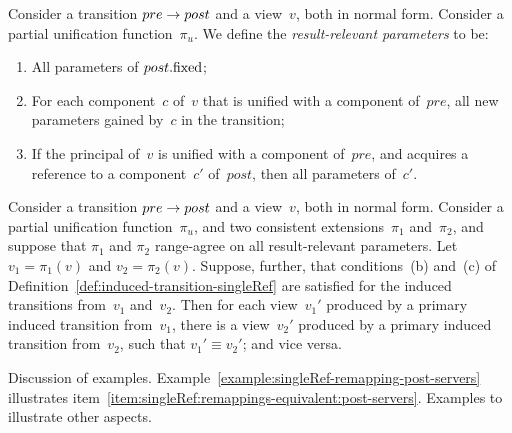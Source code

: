 \begin{definition}
Consider a transition $pre \stackrel{}\rightarrow post$ and a view~$v$, both in normal form.
Consider a partial unification function~$\pi_u$.  We define the
\emph{result-relevant parameters} to be:
%
\begin{enumerate}
\item\label{item:singleRef:remappings-equivalent:post-servers} All parameters
  of $post.\mathrm{fixed}$;

\item For each component~$c$ of~$v$ that is unified with a component of~$pre$,
  all new parameters gained by~$c$ in the transition;

\item If the principal of~$v$ is unified with a component of~$pre$, and
  acquires a reference to a component~$c'$ of~$post$, then all parameters
  of~$c'$. 
\end{enumerate}
\end{definition}

\begin{lemma}
\label{lem:singleRef:remappings-equivalent-primary}
Consider a transition $pre \stackrel{}\rightarrow post$ and a view~$v$, both in normal form.
Consider a partial unification function~$\pi_u$, and two consistent
extensions~$\pi_1$ and~$\pi_2$, and suppose that $\pi_1$ and $\pi_2$
range-agree on all result-relevant parameters.  Let $v_1 = \pi_1(v)$ and $v_2
= \pi_2(v)$.  Suppose, further, that conditions~(b) and~(c) of
Definition~\ref{def:induced-transition-singleRef} are satisfied for the
induced transitions from~$v_1$ and~$v_2$.  Then for each view~$v_1'$ produced
by a primary induced transition from~$v_1$, there is a view~$v_2'$ produced by
a primary induced transition from~$v_2$, such that $v_1' \equiv v_2'$; and
vice versa.
\end{lemma}


\framebox{**} Discussion of examples.
Example~\ref{example:singleRef-remapping-post-servers} illustrates
item~\ref{item:singleRef:remappings-equivalent:post-servers}.  Examples to
illustrate other aspects. 


